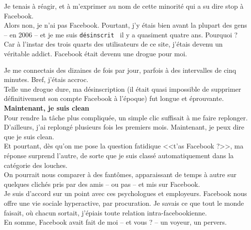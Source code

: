 \documentclass[11pt,twoside,a4paper]{article}
\begin{document}
Je tenais {\`a} r{\'e}agir, et {\`a} m'exprimer au nom de cette minorit{\'e} qui a su dire stop {\`a} Facebook. ~\\

Alors non, je n'ai pas Facebook. Pourtant, j'y {\'e}tais bien avant la plupart des gens -- en 2006 -- et je me suis \texttt{d{\'e}sinscrit~\footnotemark} il y a quasiment quatre ans. Pourquoi ? Car {\`a} l'instar des trois quarts des utilisateurs de ce site, j'{\'e}tais devenu un v{\'e}ritable addict. Facebook {\'e}tait devenu une drogue pour moi. ~\\

Je me connectais des dizaines de fois par jour, parfois {\`a} des intervalles de cinq minutes. Bref, j'{\'e}tais accroc. ~\\

Telle une drogue dure, ma d{\'e}sinscription (il {\'e}tait quasi impossible de supprimer d{\'e}finitivement son compte Facebook {\`a} l'{\'e}poque) fut longue et {\'e}prouvante. ~\\

\textbf{Maintenant, je suis clean}~\\

Pour rendre la t{\^a}che plus compliqu{\'e}e, un simple clic suffisait {\`a} me faire replonger. D'ailleurs, j'ai replong{\'e} plusieurs fois les premiers mois. Maintenant, je peux dire que je suis clean. ~\\

Et pourtant, d{\`e}s qu'on me pose la question fatidique <<t'as Facebook ?>>, ma r{\'e}ponse surprend l'autre, de sorte que je suis class{\'e} automatiquement dans la cat{\'e}gorie des louches. ~\\

On pourrait nous comparer {\`a} des fant{\^o}mes, apparaissant de temps {\`a} autre sur quelques clich{\'e}s pris par des amis -- ou pas -- et mis sur Facebook. ~\\

Je suis d'accord sur un point avec ces psychologues et employeurs. Facebook nous offre une vie sociale hyperactive, par procuration. Je savais ce que tout le monde faisait, o{\`u} chacun sortait, j'{\'e}piais toute relation intra-facebookienne. ~\\

En somme, Facebook avait fait de moi -- et vous ? -- un voyeur, un pervers. ~\\
\end{document}
